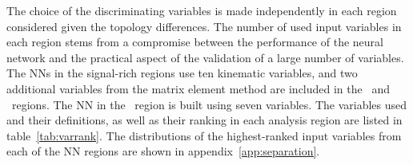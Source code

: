 %

The choice of the discriminating variables is made independently in each region considered given the topology differences.
The number of used input variables in each region stems from a compromise between the performance of the neural network and the practical aspect of the validation of a large number of variables. The NNs in the signal-rich regions use ten kinematic variables, and two additional variables from the matrix element method are included in the \sixthree\ and \sixfour\ regions. The NN in the \fivethree\ region is built using seven variables.
The variables used and their definitions, as well as their ranking in each analysis region are listed in table~\ref{tab:varrank}. 
The distributions of the highest-ranked input variables from each of the NN regions are shown
in appendix~\ref{app:separation}.


